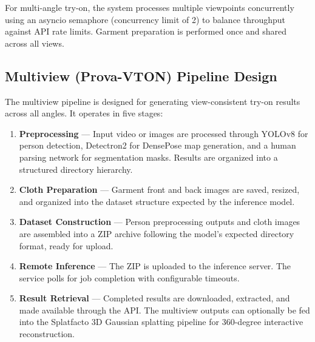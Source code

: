 For multi-angle try-on, the system processes multiple viewpoints concurrently using an asyncio semaphore (concurrency limit of 2) to balance throughput against API rate limits. Garment preparation is performed once and shared across all views.

\subsection{Multiview (Prova-VTON) Pipeline Design}
The multiview pipeline is designed for generating view-consistent try-on results across all angles. It operates in five stages:

\begin{enumerate}[leftmargin=*]
    \item \textbf{Preprocessing} — Input video or images are processed through YOLOv8 for person detection, Detectron2 for DensePose map generation, and a human parsing network for segmentation masks. Results are organized into a structured directory hierarchy.

    \item \textbf{Cloth Preparation} — Garment front and back images are saved, resized, and organized into the dataset structure expected by the inference model.

    \item \textbf{Dataset Construction} — Person preprocessing outputs and cloth images are assembled into a ZIP archive following the model's expected directory format, ready for upload.

    \item \textbf{Remote Inference} — The ZIP is uploaded to the inference server. The service polls for job completion with configurable timeouts.

    \item \textbf{Result Retrieval} — Completed results are downloaded, extracted, and made available through the API. The multiview outputs can optionally be fed into the Splatfacto 3D Gaussian splatting pipeline for 360-degree interactive reconstruction.
\end{enumerate}

